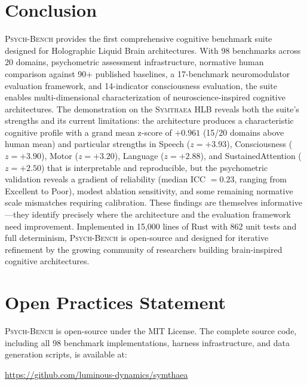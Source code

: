 \documentclass[11pt,letterpaper]{article}
\newcommand{\symthaea}{\textsc{Symthaea}}
\newcommand{\psychbench}{\textsc{Psych-Bench}}
\newcommand{\hlb}{\textsc{HLB}}
\begin{document}
\section{Conclusion}
\label{sec:conclusion}

\psychbench{} provides the first comprehensive cognitive benchmark suite designed for Holographic Liquid Brain architectures. With 98 benchmarks across 20 domains, psychometric assessment infrastructure, normative human comparison against 90+ published baselines, a 17-benchmark neuromodulator evaluation framework, and 14-indicator consciousness evaluation, the suite enables multi-dimensional characterization of neuroscience-inspired cognitive architectures. The demonstration on the \symthaea{} \hlb{} reveals both the suite's strengths and its current limitations: the architecture produces a characteristic cognitive profile with a grand mean z-score of $+0.961$ (15/20 domains above human mean) and particular strengths in Speech ($z = +3.93$), Consciousness ($z = +3.90$), Motor ($z = +3.20$), Language ($z = +2.88$), and SustainedAttention ($z = +2.50$) that is interpretable and reproducible, but the psychometric validation reveals a gradient of reliability (median ICC $= 0.23$, ranging from Excellent to Poor), modest ablation sensitivity, and some remaining normative scale mismatches requiring calibration. These findings are themselves informative---they identify precisely where the architecture and the evaluation framework need improvement. Implemented in 15,000 lines of Rust with 862 unit tests and full determinism, \psychbench{} is open-source and designed for iterative refinement by the growing community of researchers building brain-inspired cognitive architectures.

\section*{Open Practices Statement}

\psychbench{} is open-source under the MIT License. The complete source code, including all 98 benchmark implementations, harness infrastructure, and data generation scripts, is available at:

\begin{center}
\url{https://github.com/luminous-dynamics/symthaea}
\end{center}
\end{document}
